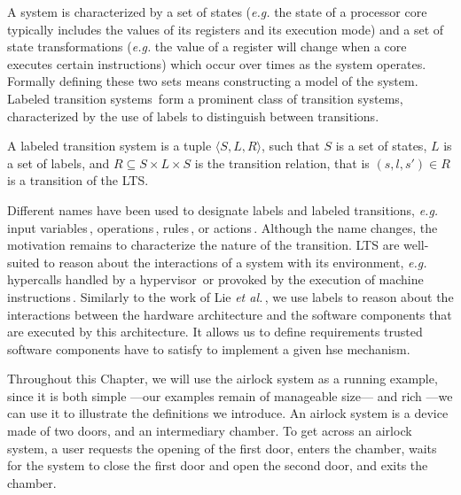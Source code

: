 A system is characterized by a set of states (\emph{e.g.} the state of a
processor core typically includes the values of its registers and its execution
mode) and a set of state transformations (\emph{e.g.}  the value of a register
will change when a core executes certain instructions) which occur over times as
the system operates.
%
Formally defining these two sets means constructing a model of the system.
%
%
Labeled transition systems\,\cite{loiseaux1995lts} form a prominent class of
transition systems, characterized by the use of labels to distinguish between
transitions.

\begin{definition}
  \label{def:sota:lts}
  A labeled transition system is a tuple \( \langle S, L, R \rangle \), such
  that \( S \) is a set of states, \( L \) is a set of labels, and
  \( R \subseteq S \times L \times S \) is the transition relation, that is
  \( (s, l, s') \in R \) is a transition of the LTS.
\end{definition}

Different names have been used to designate labels and labeled transitions,
\emph{e.g.} input variables\,\cite{cimatti2002nusmv},
operations\,\cite{jackson2012alloy}, rules\,\cite{murphi}, or
actions\,\cite{barthe2011virtcert1}.
%
Although the name changes, the motivation remains to characterize the nature of
the transition.
%
LTS are well-suited to reason about the interactions of a system with its
environment, \emph{e.g.} hypercalls handled by a
hypervisor\,\cite{barthe2011virtcert1} or \IOs provoked by the execution of
machine instructions\,\cite{lie2003xom}.
%
Similarly to the work of Lie \textit{et al.}\,\cite{lie2003xom}, we use labels
to reason about the interactions between the hardware architecture and the
software components that are executed by this architecture.
%
It allows us to define requirements trusted software components have to satisfy
to implement a given \ac{hse} mechanism.

Throughout this Chapter, we will use the airlock system as a running example,
since it is both simple ---our examples remain of manageable size--- and rich
---we can use it to illustrate the definitions we introduce.
%
An airlock system is a device made of two doors, and an intermediary chamber.
%
To get across an airlock system, a user requests the opening of the first door,
enters the chamber, waits for the system to close the first door and open the
second door, and exits the chamber.

